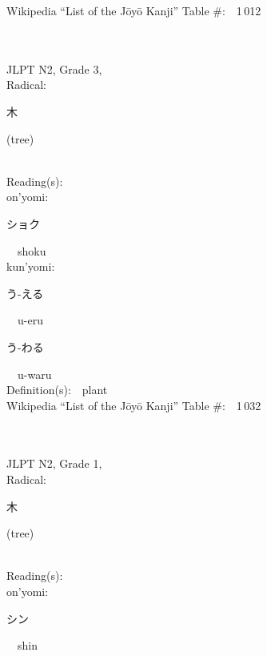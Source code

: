 \begin{multicols}{2}
Wikipedia ``List of the J\=oy\=o Kanji'' Table \#:\ \ 1\,012 \\
\ \ \\
{\fontsize{34pt}{40pt}  }\ \ \\  %
{JLPT N2, Grade 3, \\Radical:\ \ {\begin{CJK}{UTF8}{min} 木 \end{CJK}} (tree) } \\
Reading(s):\ \ \\
{\hspace*{1em}}on'yomi:\ \ \\
{\hspace*{2em}}{\begin{CJK}{UTF8}{min} ショク \end{CJK}}\ \ shoku\ \ \\
{\hspace*{1em}}kun'yomi:\ \ \\
{\hspace*{2em}}{\begin{CJK}{UTF8}{min} う-える \end{CJK}}\ \ u-eru\ \ \\
{\hspace*{2em}}{\begin{CJK}{UTF8}{min} う-わる \end{CJK}}\ \ u-waru\ \ \\
Definition(s):\ \ plant \\
Wikipedia ``List of the J\=oy\=o Kanji'' Table \#:\ \ 1\,032 \\
\ \ \\
{\fontsize{34pt}{40pt}  }\ \ \\  %
{JLPT N2, Grade 1, \\Radical:\ \ {\begin{CJK}{UTF8}{min} 木 \end{CJK}} (tree) } \\
Reading(s):\ \ \\
{\hspace*{1em}}on'yomi:\ \ \\
{\hspace*{2em}}{\begin{CJK}{UTF8}{min} シン \end{CJK}}\ \ shin\ \ \\

\end{multicols}
